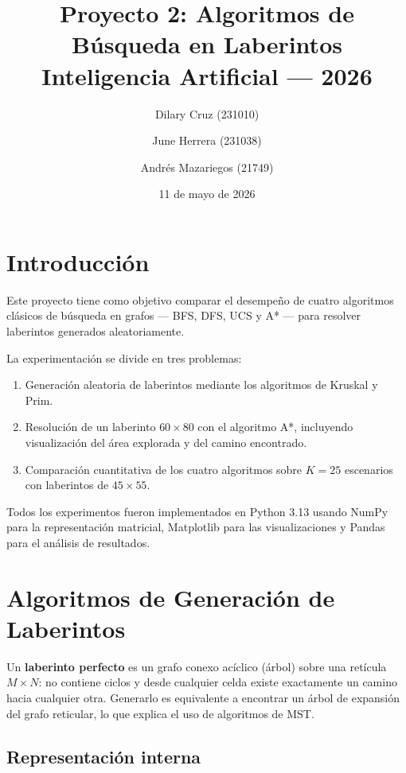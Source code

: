 \documentclass[12pt,a4paper]{article}
\title{%
  \textbf{Proyecto 2: Algoritmos de Búsqueda en Laberintos}\\[4pt]
  \large Inteligencia Artificial --- 2026
}
\author{
  Dilary Cruz (231010) \and
  June Herrera (231038) \and
  Andrés Mazariegos (21749)
}
\date{11 de mayo de 2026}
\begin{document}
\maketitle
\tableofcontents
\newpage

\section{Introducción}

Este proyecto tiene como objetivo comparar el desempeño de cuatro
algoritmos clásicos de búsqueda en grafos --- BFS, DFS, UCS y A* ---
para resolver laberintos generados aleatoriamente.

La experimentación se divide en tres problemas:
\begin{enumerate}
  \item Generación aleatoria de laberintos mediante los algoritmos de
        Kruskal y Prim.
  \item Resolución de un laberinto $60\times80$ con el algoritmo A*,
        incluyendo visualización del área explorada y del camino
        encontrado.
  \item Comparación cuantitativa de los cuatro algoritmos sobre $K=25$
        escenarios con laberintos de $45\times55$.
\end{enumerate}

Todos los experimentos fueron implementados en Python 3.13 usando
NumPy para la representación matricial, Matplotlib para las
visualizaciones y Pandas para el análisis de resultados.

\section{Algoritmos de Generación de Laberintos}

Un \textbf{laberinto perfecto} es un grafo conexo acíclico (árbol)
sobre una retícula $M\times N$: no contiene ciclos y desde cualquier
celda existe exactamente un camino hacia cualquier otra. Generarlo es
equivalente a encontrar un árbol de expansión del grafo reticular, lo
que explica el uso de algoritmos de MST.

\subsection{Representación interna}
\end{document}
